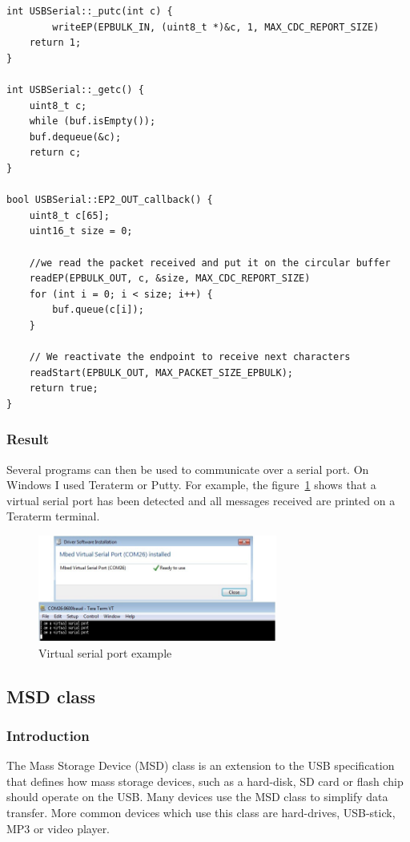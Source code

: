\documentclass[pdftex,10pt,a4paper]{report}
\begin{document}
\begin{lstlisting}[label=USBSerial: putc and getc,caption=USBSerial: putc and getc]
int USBSerial::_putc(int c) {
		writeEP(EPBULK_IN, (uint8_t *)&c, 1, MAX_CDC_REPORT_SIZE)
    return 1;
}

int USBSerial::_getc() {
    uint8_t c;
    while (buf.isEmpty());
    buf.dequeue(&c);
    return c;
}

bool USBSerial::EP2_OUT_callback() {
    uint8_t c[65];
    uint16_t size = 0;

    //we read the packet received and put it on the circular buffer
    readEP(EPBULK_OUT, c, &size, MAX_CDC_REPORT_SIZE)
    for (int i = 0; i < size; i++) {
        buf.queue(c[i]);
    }

    // We reactivate the endpoint to receive next characters
    readStart(EPBULK_OUT, MAX_PACKET_SIZE_EPBULK);
    return true;
}
\end{lstlisting}

\subsubsection{Result}
Several programs can then be used to communicate over a serial port. On Windows I used Teraterm or Putty. For example, the figure~\ref{Virtual serial port example} shows that a virtual serial port has been detected and all messages received are printed on a Teraterm terminal.

\begin{figure}[h!]
		\centering
		\includegraphics[width=0.7\textwidth]{./serial_port_win.jpg}
		\caption{Virtual serial port example}
		\label{Virtual serial port example}
\end{figure}



\subsection{MSD class}
\subsubsection{Introduction}
The Mass Storage Device (MSD) class is an extension to the USB specification that defines
how mass storage devices, such as a hard-disk, SD card or flash chip should operate on the USB.
Many devices use the MSD class to simplify data transfer. More common devices which use this class are hard-drives, USB-stick, MP3 or video player.
\end{document}
